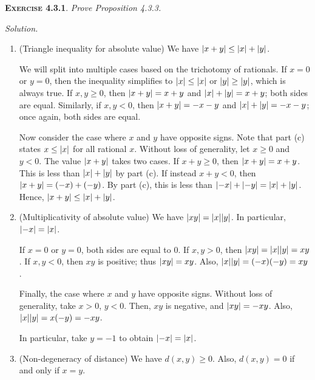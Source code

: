 \documentclass[12pt]{article}
\theoremstyle{remark}
\newenvironment{exer}[2]{
    \noindent \setlength{\parskip}{1em}%
    \textsc{\textbf{Exercise #1}}. \textit{#2} \par
    \noindent \textit{Solution.} %
}{\bigskip}
\begin{document}
\begin{exer}{4.3.1}{
    Prove Proposition 4.3.3.
}
\begin{enumerate}[topsep=0mm,label=(\alph*)]
            In particular, take $y = \abs{x}$; thus $\abs{x} \ge \abs{x}$.
            Then, we have $-\abs{x} \le x \le \abs{x}$ as desired.
            
        \item[(b)] (Triangle inequality for absolute value) We have $\abs{x+y} \le \abs{x} + \abs{y}$.

            We will split into multiple cases based on the trichotomy of rationals.
            If $x = 0$ or $y = 0$, then the inequality simplifies to $\abs{x} \le \abs{x}$ or $\abs{y} \ge \abs{y}$, which is always true.
            If $x, y \ge 0$, then $\abs{x + y} = x + y$ and $\abs{x} + \abs{y} = x + y$; both sides are equal.
            Similarly, if $x, y < 0$, then $\abs{x + y} = -x - y$ and $\abs{x} + \abs{y} = -x -y$; once again, both sides are equal.

            Now consider the case where $x$ and $y$ have opposite signs.
            Note that part (c) states $x \le \abs{x}$ for all rational $x$.
            Without loss of generality, let $x \ge 0$ and $y < 0$.
            The value $\abs{x + y}$ takes two cases.
            If $x + y \ge 0$, then $\abs{x + y} = x + y$.
            This is less than $\abs{x} + \abs{y}$ by part (c).
            If instead $x + y < 0$, then $\abs{x + y} = (-x) + (-y)$.
            By part (c), this is less than $\abs{-x} + \abs{-y} = \abs{x} + \abs{y}$.
            Hence, $\abs{x+y} \le \abs{x} + \abs{y}$.

        \item[(d)] (Multiplicativity of absolute value)
            We have $\abs{xy} = \abs{x}\abs{y}$.
            In particular, $\abs{-x} = \abs{x}$.

            If $x = 0$ or $y = 0$, both sides are equal to $0$.
            If $x, y > 0$, then $\abs{xy} = \abs{x}\abs{y} = xy$.
            If $x, y < 0$, then $xy$ is positive; thus $\abs{xy} = xy$.
            Also, $\abs{x}\abs{y} = (-x)(-y) = xy$.
            
            Finally, the case where $x$ and $y$ have opposite signs.
            Without loss of generality, take $x > 0$, $y < 0$.
            Then, $xy$ is negative, and $\abs{xy} = -xy$.
            Also, $\abs{x}\abs{y} = x(-y) = -xy$.

            In particular, take $y = -1$ to obtain $\abs{-x} = \abs{x}$.

        \item[(e)] (Non-degeneracy of distance)
            We have $d(x, y) \ge 0$.
            Also, $d(x, y) = 0$ if and only if $x = y$.


\end{enumerate}
\end{exer}
\end{document}
